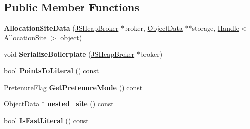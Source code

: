 \subsection*{Public Member Functions}
\begin{DoxyCompactItemize}
\item 
\mbox{\label{classv8_1_1internal_1_1compiler_1_1AllocationSiteData_ad8287f0a2163e8966a2a07545508f737}} 
{\bfseries Allocation\+Site\+Data} (\mbox{\hyperlink{classv8_1_1internal_1_1compiler_1_1JSHeapBroker}{J\+S\+Heap\+Broker}} $\ast$broker, \mbox{\hyperlink{classv8_1_1internal_1_1compiler_1_1ObjectData}{Object\+Data}} $\ast$$\ast$storage, \mbox{\hyperlink{classv8_1_1internal_1_1Handle}{Handle}}$<$ \mbox{\hyperlink{classv8_1_1internal_1_1AllocationSite}{Allocation\+Site}} $>$ object)
\item 
\mbox{\label{classv8_1_1internal_1_1compiler_1_1AllocationSiteData_a95a911e7220383170d1ffc53a277dc3f}} 
void {\bfseries Serialize\+Boilerplate} (\mbox{\hyperlink{classv8_1_1internal_1_1compiler_1_1JSHeapBroker}{J\+S\+Heap\+Broker}} $\ast$broker)
\item 
\mbox{\label{classv8_1_1internal_1_1compiler_1_1AllocationSiteData_a224126bdf5954a6077a87f5dfbf385d6}} 
\mbox{\hyperlink{classbool}{bool}} {\bfseries Points\+To\+Literal} () const
\item 
\mbox{\label{classv8_1_1internal_1_1compiler_1_1AllocationSiteData_a46338165143126418fc9a21b9ecb7ffe}} 
Pretenure\+Flag {\bfseries Get\+Pretenure\+Mode} () const
\item 
\mbox{\label{classv8_1_1internal_1_1compiler_1_1AllocationSiteData_a094ff3367c7dba3160fc3d3a0a2213de}} 
\mbox{\hyperlink{classv8_1_1internal_1_1compiler_1_1ObjectData}{Object\+Data}} $\ast$ {\bfseries nested\+\_\+site} () const
\item 
\mbox{\label{classv8_1_1internal_1_1compiler_1_1AllocationSiteData_a2c58b7822d7a58d814c84311a2cf445a}} 
\mbox{\hyperlink{classbool}{bool}} {\bfseries Is\+Fast\+Literal} () const
$$
\end{DoxyCompactItemize}
